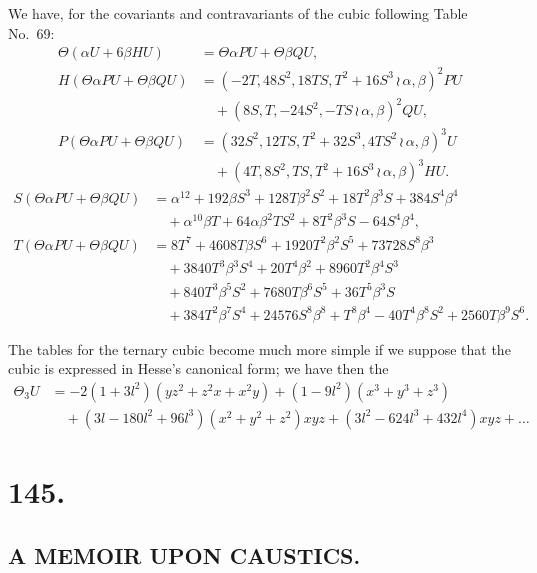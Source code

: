\documentclass[11pt,a4paper]{article}
\begin{document}
We have, for the covariants and contravariants of the cubic following Table No.~69:
\begin{align*}
\Theta(\alpha U + 6\beta HU) &= \Theta\alpha PU + \Theta\beta QU,\\
H(\Theta\alpha PU + \Theta\beta QU) &= (-2T, 48S^2, 18TS, T^2 + 16S^3 \, \wr\, \alpha, \beta)^2 PU\\
&\quad + (8S, T, -24S^2, -TS \, \wr\, \alpha, \beta)^2 QU,\\
P(\Theta\alpha PU + \Theta\beta QU) &= (32S^2, 12TS, T^2 + 32S^3, 4TS^2 \, \wr\, \alpha, \beta)^3 U\\
&\quad + (4T, 8S^2, TS, T^2 + 16S^3 \, \wr\, \alpha, \beta)^3 HU.
\end{align*}
\begin{align*}
S(\Theta\alpha PU + \Theta\beta QU) &= \alpha^{12} + 192\beta S^3 + 128T\beta^2S^2 + 18T^2\beta^3S + 384S^4\beta^4\\
&\quad + \alpha^{10}\beta T + 64\alpha\beta^2TS^2 + 8T^2\beta^3S - 64S^4\beta^4,\\
T(\Theta\alpha PU + \Theta\beta QU) &= 8T^7 + 4608T\beta S^6 + 1920T^2\beta^2S^5 + 73728S^8\beta^3\\
&\quad + 3840T^3\beta^3S^4 + 20T^4\beta^2 + 8960T^2\beta^4S^3\\
&\quad + 840T^3\beta^5S^2 + 7680T\beta^6S^5 + 36T^5\beta^3S\\
&\quad + 384T^2\beta^7S^4 + 24576S^8\beta^8 + T^8\beta^4 - 40T^4\beta^8S^2 + 2560T\beta^9S^6.
\end{align*}

The tables for the ternary cubic become much more simple if we suppose that
the cubic is expressed in Hesse's canonical form; we have then the
\begin{align*}
\Theta_3 U &= -2(1 + 3l^2)(yz^2 + z^2x + x^2y) + (1 - 9l^2)(x^3 + y^3 + z^3)\\
&\quad + (3l - 180l^2 + 96l^3)(x^2 + y^2 + z^2)xyz + (3l^2 - 624l^3 + 432l^4)xyz + \ldots
\end{align*}

\clearpage
\section*{145.}
\subsection*{A MEMOIR UPON CAUSTICS.}
\end{document}

